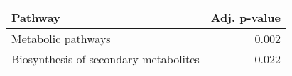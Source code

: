 \begin{tabular}{lr}
\toprule
                               Pathway &  Adj. p-value \\
\midrule
                    Metabolic pathways &         0.002 \\
 Biosynthesis of secondary metabolites &         0.022 \\
\bottomrule
\end{tabular}
